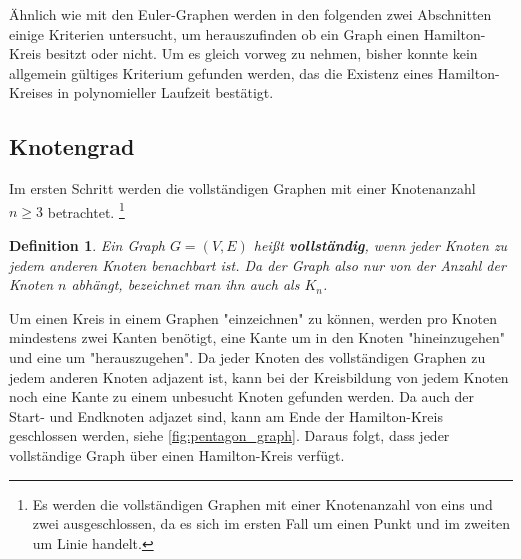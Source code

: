 \documentclass{article}
\newtheorem{mydef}{Definition}
\begin{document}
Ähnlich wie mit den Euler-Graphen werden in den folgenden zwei Abschnitten einige Kriterien untersucht, um herauszufinden ob ein Graph einen Hamilton-Kreis besitzt oder nicht. Um es gleich vorweg zu nehmen, bisher konnte kein allgemein gültiges Kriterium gefunden werden, das die Existenz eines Hamilton-Kreises in polynomieller Laufzeit bestätigt.

%
%
\subsection{Knotengrad}

Im ersten Schritt werden die vollständigen Graphen mit einer Knotenanzahl $n \geq 3$ betrachtet. \footnote{Es werden die vollständigen Graphen mit einer Knotenanzahl von eins und zwei ausgeschlossen, da es sich im ersten Fall um einen Punkt und im zweiten um Linie handelt.}

\begin{mydef}
	Ein Graph $G=(V,E)$ heißt \textbf{vollständig}, wenn jeder Knoten zu jedem anderen Knoten benachbart ist. Da der Graph also nur von der Anzahl der Knoten $n$ abhängt, bezeichnet man ihn auch als $K_n$. \cite{busing2010graphen}
\end{mydef}

Um einen Kreis in einem Graphen "einzeichnen" zu können, werden pro Knoten mindestens zwei Kanten benötigt, eine Kante um in den Knoten "hineinzugehen" und eine um "herauszugehen". Da jeder Knoten des vollständigen Graphen zu jedem anderen Knoten adjazent ist, kann bei der Kreisbildung von jedem Knoten noch eine Kante zu einem unbesucht Knoten gefunden werden. Da auch der Start- und Endknoten adjazet sind, kann am Ende der Hamilton-Kreis geschlossen werden, siehe \autoref{fig:pentagon_graph}.
Daraus folgt, dass jeder vollständige Graph über einen Hamilton-Kreis verfügt.
\end{document}
